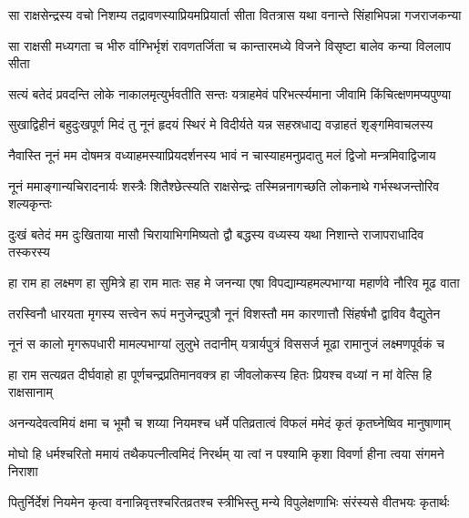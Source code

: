 
\fourlineindentedshloka
{सा राक्षसेन्द्रस्य वचो निशम्य}
{ तद्रावणस्याप्रियमप्रियार्ता}
{सीता वितत्रास यथा वनान्ते}
{ सिंहाभिपन्ना गजराजकन्या} %

\fourlineindentedshloka
{सा राक्षसी मध्यगता च भीरु}
{र्वाग्भिर्भृशं रावणतर्जिता च}
{कान्तारमध्ये विजने विसृष्टा}
{ बालेव कन्या विललाप सीता} %

\fourlineindentedshloka
{सत्यं बतेदं प्रवदन्ति लोके}
{ नाकालमृत्युर्भवतीति सन्तः}
{यत्राहमेवं परिभर्त्स्यमाना}
{ जीवामि किंचित्क्षणमप्यपुण्या} %

\fourlineindentedshloka
{सुखाद्विहीनं बहुदुःखपूर्ण}
{मिदं तु नूनं हृदयं स्थिरं मे}
{विदीर्यते यन्न सहस्रधाद्य}
{ वज्राहतं शृङ्गमिवाचलस्य} %

\fourlineindentedshloka
{नैवास्ति नूनं मम दोषमत्र}
{ वध्याहमस्याप्रियदर्शनस्य}
{भावं न चास्याहमनुप्रदातु}
{मलं द्विजो मन्त्रमिवाद्विजाय} %

\fourlineindentedshloka
{नूनं ममाङ्गान्यचिरादनार्यः}
{ शस्त्रैः शितैश्छेत्स्यति राक्षसेन्द्रः}
{तस्मिन्ननागच्छति लोकनाथे}
{ गर्भस्थजन्तोरिव शल्यकृन्तः} %

\fourlineindentedshloka
{दुःखं बतेदं मम दुःखिताया}
{ मासौ चिरायाभिगमिष्यतो द्वौ}
{बद्धस्य वध्यस्य यथा निशान्ते}
{ राजापराधादिव तस्करस्य} %

\fourlineindentedshloka
{हा राम हा लक्ष्मण हा सुमित्रे}
{ हा राम मातः सह मे जनन्या}
{एषा विपद्याम्यहमल्पभाग्या}
{ महार्णवे नौरिव मूढ वाता} %

\fourlineindentedshloka
{तरस्विनौ धारयता मृगस्य}
{ सत्त्वेन रूपं मनुजेन्द्रपुत्रौ}
{नूनं विशस्तौ मम कारणात्तौ}
{ सिंहर्षभौ द्वाविव वैद्युतेन} %

\fourlineindentedshloka
{नूनं स कालो मृगरूपधारी}
{ मामल्पभाग्यां लुलुभे तदानीम्}
{यत्रार्यपुत्रं विससर्ज मूढा}
{ रामानुजं लक्ष्मणपूर्वकं च} %

\fourlineindentedshloka
{हा राम सत्यव्रत दीर्घवाहो}
{ हा पूर्णचन्द्रप्रतिमानवक्त्र}
{हा जीवलोकस्य हितः प्रियश्च}
{ वध्यां न मां वेत्सि हि राक्षसानाम्} %

\fourlineindentedshloka
{अनन्यदेवत्वमियं क्षमा च}
{ भूमौ च शय्या नियमश्च धर्मे}
{पतिव्रतात्वं विफलं ममेदं}
{ कृतं कृतघ्नेष्विव मानुषाणाम्} %

\fourlineindentedshloka
{मोघो हि धर्मश्चरितो ममायं}
{ तथैकपत्नीत्वमिदं निरर्थम्}
{या त्वां न पश्यामि कृशा विवर्णा}
{ हीना त्वया संगमने निराशा} %

\fourlineindentedshloka
{पितुर्निर्देशं नियमेन कृत्वा}
{ वनान्निवृत्तश्चरितव्रतश्च}
{स्त्रीभिस्तु मन्ये विपुलेक्षणाभिः}
{ संरंस्यसे वीतभयः कृतार्थः} %

